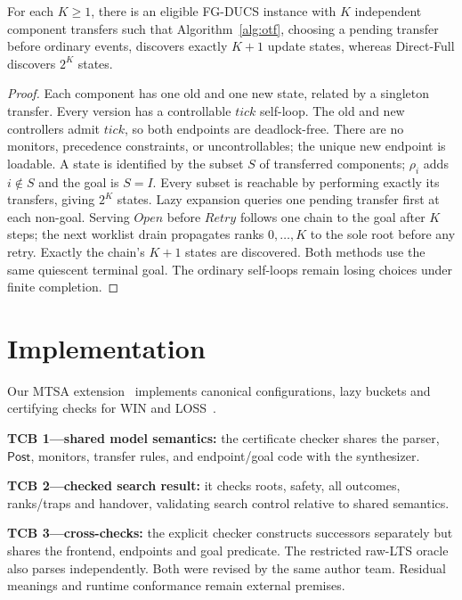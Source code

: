 \documentclass[acmsmall,screen,review,anonymous]{acmart}
\newcommand{\Post}{\mathsf{Post}}
\begin{document}
\begin{theorem}
\label{thm:lazy-separation}
For each $K\geq1$, there is an eligible FG-DUCS instance with $K$ independent component transfers such that Algorithm~\ref{alg:otf}, choosing a pending transfer before ordinary events, discovers exactly $K+1$ update states, whereas Direct-Full discovers $2^K$ states.
\end{theorem}
\begin{proof}
Each component has one old and one new state, related by a singleton transfer. Every version has a controllable $tick$ self-loop. The old and new controllers admit $tick$, so both endpoints are deadlock-free. There are no monitors, precedence constraints, or uncontrollables; the unique new endpoint is loadable. A state is identified by the subset $S$ of transferred components; $\rho_i$ adds $i\notin S$ and the goal is $S=I$. Every subset is reachable by performing exactly its transfers, giving $2^K$ states. Lazy expansion queries one pending transfer first at each non-goal. Serving $Open$ before $Retry$ follows one chain to the goal after $K$ steps; the next worklist drain propagates ranks $0,\ldots,K$ to the sole root before any retry. Exactly the chain's $K+1$ states are discovered. Both methods use the same quiescent terminal goal. The ordinary self-loops remain losing choices under finite completion.
\end{proof}

\section{Implementation}
\label{sec:proof}
\label{sec:runtime-boundary}

Our MTSA extension~\cite{paper:MTSA2008} implements canonical configurations, lazy buckets and certifying checks for WIN and LOSS~\cite{McConnellEtAl2011Certifying}.
\par\noindent\textbf{TCB 1---shared model semantics:} the certificate checker shares the parser, $\Post$, monitors, transfer rules, and endpoint/goal code with the synthesizer.
\par\noindent\textbf{TCB 2---checked search result:} it checks roots, safety, all outcomes, ranks/traps and handover, validating search control relative to shared semantics.
\par\noindent\textbf{TCB 3---cross-checks:} the explicit checker constructs successors separately but shares the frontend, endpoints and goal predicate. The restricted raw-LTS oracle also parses independently. Both were revised by the same author team. Residual meanings and runtime conformance remain external premises.
\end{document}
